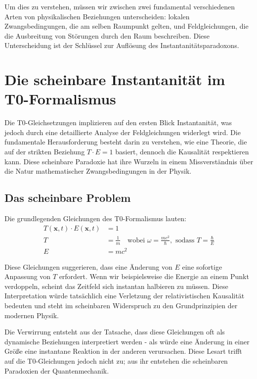 	Um dies zu verstehen, müssen wir zwischen zwei fundamental verschiedenen Arten von physikalischen Beziehungen unterscheiden: lokalen Zwangsbedingungen, die am selben Raumpunkt gelten, und Feldgleichungen, die die Ausbreitung von Störungen durch den Raum beschreiben. Diese Unterscheidung ist der Schlüssel zur Auflösung des Instantanitätsparadoxons.
	
	\section{Die scheinbare Instantanität im T0-Formalismus}
	
	Die T0-Gleichsetzungen implizieren auf den ersten Blick Instantanität, was jedoch durch eine detaillierte Analyse der Feldgleichungen widerlegt wird. Die fundamentale Herausforderung besteht darin zu verstehen, wie eine Theorie, die auf der strikten Beziehung $T \cdot E = 1$ basiert, dennoch die Kausalität respektieren kann. Diese scheinbare Paradoxie hat ihre Wurzeln in einem Missverständnis über die Natur mathematischer Zwangsbedingungen in der Physik.
	
	\subsection{Das scheinbare Problem}
	
	Die grundlegenden Gleichungen des T0-Formalismus lauten:
	\begin{align}
		T(\mathbf{x},t) \cdot E(\mathbf{x},t) &= 1 \label{eq:TE_constraint} \\
		T &= \frac{1}{m} \quad \text{wobei } \omega = \frac{mc^2}{\hbar}, \text{ sodass } T = \frac{\hbar}{E} \label{eq:T_definition} \\
		E &= mc^2 \label{eq:E_definition}
	\end{align}
	
	Diese Gleichungen suggerieren, dass eine Änderung von $E$ eine sofortige Anpassung von $T$ erfordert. Wenn wir beispielsweise die Energie an einem Punkt verdoppeln, scheint das Zeitfeld sich instantan halbieren zu müssen. Diese Interpretation würde tatsächlich eine Verletzung der relativistischen Kausalität bedeuten und steht im scheinbaren Widerspruch zu den Grundprinzipien der modernen Physik.
	
	Die Verwirrung entsteht aus der Tatsache, dass diese Gleichungen oft als dynamische Beziehungen interpretiert werden - als würde eine Änderung in einer Größe eine instantane Reaktion in der anderen verursachen. Diese Lesart trifft auf die T0-Gleichungen jedoch nicht zu; aus ihr entstehen die scheinbaren Paradoxien der Quantenmechanik.
	
